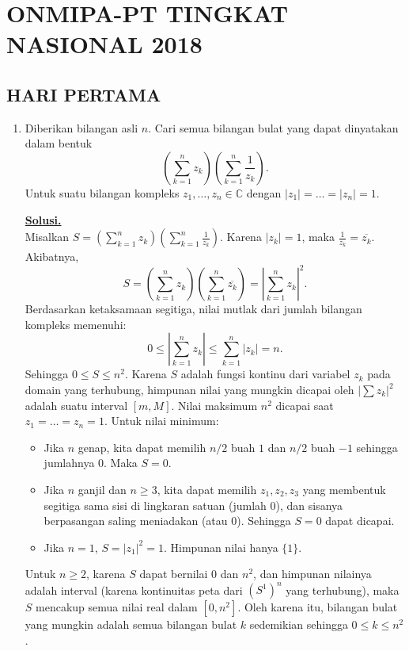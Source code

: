 \documentclass[12pt,twoside]{article}
\newenvironment{solution}
{
	\par\noindent\textbf{\underline{Solusi.}}\\
}
{
	\par
}
\begin{document}
\section{ONMIPA-PT TINGKAT NASIONAL 2018}
\subsection{HARI PERTAMA}
\begin{enumerate}
  \item Diberikan bilangan asli $n$. Cari semua bilangan bulat yang dapat dinyatakan dalam bentuk
        \begin{equation*}
          \left( \displaystyle\sum_{k=1}^{n} z_k \right)\left( \displaystyle\sum_{k=1}^{n} \dfrac{1}{z_k} \right).
        \end{equation*}
        Untuk suatu bilangan kompleks $z_1,\dots,z_n \in \mathbb{C}$ dengan $|z_1|=\dots = |z_n|=1$.

        \begin{solution}
          Misalkan $S = \left(\sum_{k=1}^n z_k\right) \left(\sum_{k=1}^n \frac{1}{z_k}\right)$. Karena $|z_k|=1$, maka $\frac{1}{z_k} = \overline{z_k}$.
          Akibatnya,
          \[ S = \left(\sum_{k=1}^n z_k\right) \left(\sum_{k=1}^n \overline{z_k}\right) = \left|\sum_{k=1}^n z_k\right|^2. \]
          Berdasarkan ketaksamaan segitiga, nilai mutlak dari jumlah bilangan kompleks memenuhi:
          \[ 0 \le \left|\sum_{k=1}^n z_k\right| \le \sum_{k=1}^n |z_k| = n. \]
          Sehingga $0 \le S \le n^2$.
          Karena $S$ adalah fungsi kontinu dari variabel $z_k$ pada domain yang terhubung, himpunan nilai yang mungkin dicapai oleh $|\sum z_k|^2$ adalah suatu interval $[m, M]$.
          Nilai maksimum $n^2$ dicapai saat $z_1 = \dots = z_n = 1$.
          Untuk nilai minimum:
          \begin{itemize}
            \item Jika $n$ genap, kita dapat memilih $n/2$ buah $1$ dan $n/2$ buah $-1$ sehingga jumlahnya $0$. Maka $S=0$.
            \item Jika $n$ ganjil dan $n \ge 3$, kita dapat memilih $z_1, z_2, z_3$ yang membentuk segitiga sama sisi di lingkaran satuan (jumlah 0), dan sisanya berpasangan saling meniadakan (atau 0). Sehingga $S=0$ dapat dicapai.
            \item Jika $n=1$, $S = |z_1|^2 = 1$. Himpunan nilai hanya $\{1\}$.
          \end{itemize}
          Untuk $n \ge 2$, karena $S$ dapat bernilai $0$ dan $n^2$, dan himpunan nilainya adalah interval (karena kontinuitas peta dari $(S^1)^n$ yang terhubung), maka $S$ mencakup semua nilai real dalam $[0, n^2]$.
          Oleh karena itu, bilangan bulat yang mungkin adalah semua bilangan bulat $k$ sedemikian sehingga $0 \le k \le n^2$.


\end{solution}
\end{enumerate}
\end{document}
